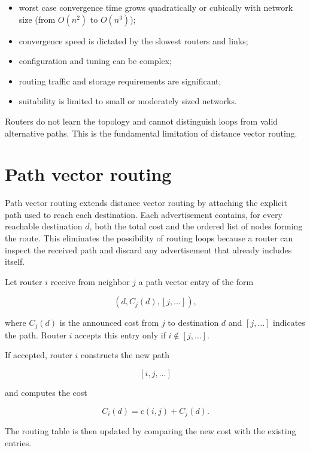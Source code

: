\begin{itemize}
\item worst case convergence time grows quadratically or cubically with network size (from $O(n^2)$ to $O(n^3)$);
\item convergence speed is dictated by the slowest routers and links;
\item configuration and tuning can be complex;
\item routing traffic and storage requirements are significant;
\item suitability is limited to small or moderately sized networks.
\end{itemize}

Routers do not learn the topology and cannot distinguish loops from valid alternative paths. This is the fundamental limitation of distance vector routing.

\section{Path vector routing}

Path vector routing extends distance vector routing by attaching the explicit path used to reach each destination. Each advertisement contains, for every reachable destination $d$, both the total cost and the ordered list of nodes forming the route. This eliminates the possibility of routing loops because a router can inspect the received path and discard any advertisement that already includes itself.

\begin{center}
\end{center}


Let router $i$ receive from neighbor $j$ a path vector entry of the form

\[ (d, C_j(d), [j, \dots]), \]

\noindent where $C_j(d)$ is the announced cost from $j$ to destination $d$ and $[j, \dots]$ indicates the path. Router $i$ accepts this entry only if $i \notin [j, \dots]$.

If accepted, router $i$ constructs the new path

\[ [i, j, \dots] \]

\noindent and computes the cost

\[ C_i(d) = c(i,j) + C_j(d). \]

The routing table is then updated by comparing the new cost with the existing entries.


